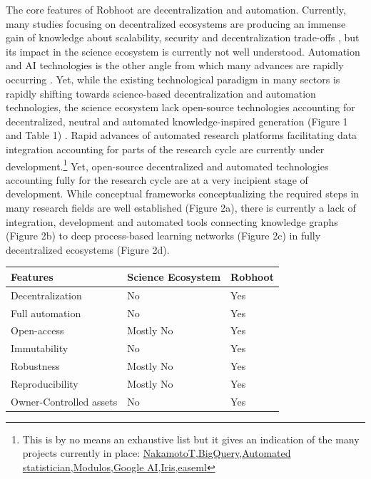 \documentclass[10pt, a4paper, twocolumn]{article} %
\begin{document}
{The core features of Robhoot are decentralization and
automation. Currently, many studies focusing on decentralized
ecosystems are producing an immense gain of knowledge about
scalability, security and decentralization trade-offs
\citep{Golem2016,Durov2017,Androulaki2018,OceanProtocolFoundation2018,BigchainDBGmbH2018},
but its impact in the science ecosystem is currently not well
understood. Automation and AI technologies is the other angle from
which many advances are rapidly occurring
\citep{Schmidhuber:2015,Reichstein,Gil2019}. Yet, while the existing
technological paradigm in many sectors is rapidly shifting towards
science-based decentralization and automation technologies, the
science ecosystem lack open-source technologies accounting for
decentralized, neutral and automated knowledge-inspired generation
(Figure 1 and Table 1) \citep{Gunther2018}. Rapid advances of
automated research platforms facilitating data integration accounting
for parts of the research cycle are currently under
development.\footnote{This is by no means an exhaustive list but it
  gives an indication of the many projects currently in place:
  \href{https://www.nterminal.com}{NakamotoT},\href{https://cloud.google.com/bigquery/}{BigQuery},\href{https://www.automaticstatistician.com/index/}{Automated
    statistician},\href{http://www.modulos.ai/}{Modulos},\href{https://ai.google/}{Google
    AI},\href{https://iris.ai}{Iris},\href{https://github.com/DS3Lab/easeml}{easeml}}
Yet, open-source decentralized and automated technologies accounting
fully for the research cycle are at a very incipient stage of
development. While conceptual frameworks conceptualizing the required
steps in many research fields are well established (Figure 2a), there
is currently a lack of integration, development and automated tools
connecting knowledge graphs (Figure 2b) to deep process-based learning
networks (Figure 2c) in fully decentralized ecosystems (Figure 2d).

\begin{table}
\begin{tabular}{ p{3cm} | p{2cm} | p{2cm}}
  \hline \hline
  \textbf{Features} & \textbf{Science Ecosystem} &\textbf{Robhoot}\\  \hline
  Decentralization & No & Yes \\ \hline
  Full automation & No & Yes \\ \hline
  Open-access & Mostly No & Yes \\ \hline
  Immutability & No & Yes \\ \hline
  Robustness & Mostly No & Yes \\ \hline
  Reproducibility & Mostly No & Yes \\ \hline        
  Owner-Controlled assets & No & Yes \\ \hline       
  \bottomrule


\end{tabular}
\end{table}}
\end{document}
